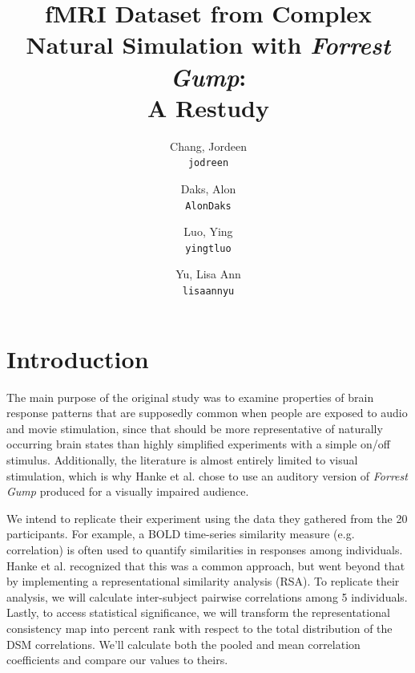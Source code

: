\documentclass[11pt]{article}
\title{fMRI Dataset from Complex Natural Simulation with \emph{Forrest Gump}: \\A Restudy}
\author{
  Chang, Jordeen\\
  \texttt{jodreen}
  \and
  Daks, Alon\\
  \texttt{AlonDaks}
  \and
  Luo, Ying\\
  \texttt{yingtluo}
  \and
  Yu, Lisa Ann\\
  \texttt{lisaannyu}
}
\begin{document}
\maketitle


\section{Introduction}

The main purpose of the original study was to examine properties of brain
response patterns that are supposedly common when people are exposed to audio
and movie stimulation, since that should be more representative of naturally 
occurring brain states than highly simplified experiments with a simple on/off
stimulus.  Additionally, the literature is almost entirely limited to visual 
stimulation, which is why Hanke et al. chose to use an auditory version of 
\emph{Forrest Gump} produced for a visually impaired audience. 

We intend to replicate their experiment using the data
they gathered from the 20 participants. For example, a BOLD time-series
similarity measure (e.g. correlation) is often used to quantify similarities
in responses among individuals. Hanke et al. recognized that this was a common
approach, but went beyond that by implementing a representational
similarity analysis (RSA)\cite{hank2014audiomovie}. To replicate their 
analysis, we will calculate inter-subject pairwise correlations among 5 individuals.
Lastly, to access statistical significance, we will transform the 
representational consistency map into percent rank with respect to the total 
distribution of the DSM correlations. We'll calculate both the pooled and mean 
correlation coefficients and compare our values to theirs.
\end{document}
